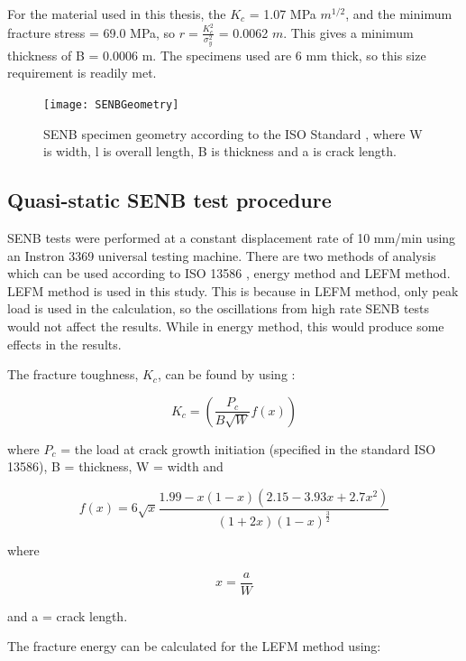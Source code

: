 \documentclass[numbers=noendperiod,chapterprefix=on]{icldt} %
\begin{document}
For the material used in this thesis, the $ K_{c} $ =  1.07
MPa $ m^{1/2} $, and the minimum fracture stress =  69.0 MPa, so $ r = \frac{K_{c}^2}{\sigma_{y}^{2}} $ = 0.0062 $ m $. This gives a minimum thickness of B = 0.0006 m. The specimens used are 6 mm thick, so this size requirement is readily met. 

\begin{figure}[!hp]
\centering
\texttt{[image: SENBGeometry]}
\caption{SENB specimen geometry according to the ISO Standard \cite{ISO13586}, where W is width, l is overall length, B is thickness and a is crack length.} \label{SENBGeometry}
\end{figure}
\FloatBarrier

\subsection{Quasi-static SENB test procedure}

SENB tests were performed at a constant displacement rate of 10 mm/min using an Instron 3369 universal testing machine.
There are two methods of analysis which can be used according to ISO 13586 \cite{ISO13586}, energy method and LEFM method. LEFM method is used in this study. This is because in LEFM method,
only peak load is used in the calculation, so the oscillations from high rate SENB tests would not affect the results. While in energy method, this would produce some effects in the results.  

The fracture toughness, $K_c$, can be found by using  \cite{Chong2015,ISO13586}: 

\begin{equation} 
K_c = (\dfrac{P_c}{B \sqrt{W} }f(x))
\end{equation}

where $ P_{c} $ = the load at crack growth initiation (specified in the standard ISO 13586), B = thickness, W = width and 

\begin{equation}
f(x) = 6\sqrt{x} \dfrac{1.99-x(1-x)(2.15-3.93x+2.7x^{2})}{(1+2x)(1-x)^{\frac{3}{2}}}
\end{equation}

where 

\begin{equation}
x = \dfrac{a}{W}
\end{equation}

and a = crack length.

The fracture energy can be calculated for the LEFM method \cite{Karac2011} using:
\end{document}

